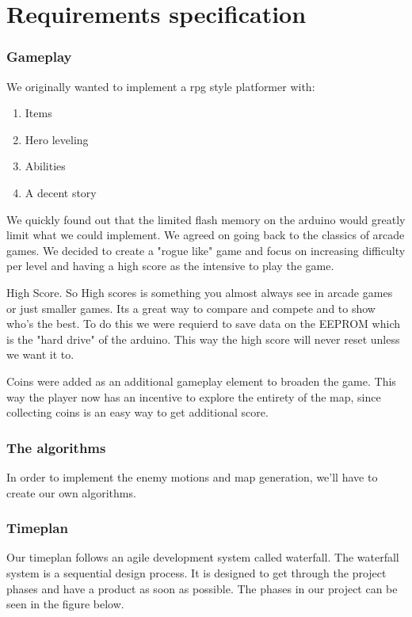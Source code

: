 \chapter{Requirements specification}

\subsection{Gameplay}%
We originally wanted to implement a rpg style platformer with:
\begin{enumerate}
\item Items
\item Hero leveling
\item Abilities
\item A decent story
\end{enumerate}
We quickly found out that the limited flash memory on the arduino would greatly limit what we could implement. We agreed on going back to the classics of arcade games. We decided to create a "rogue like" game and focus on increasing difficulty per level and having a high score as the intensive to play the game.

High Score.
So High scores is something you almost always see in arcade games or just smaller games. Its a great way to compare and compete and to show who's the best. 
To do this we were requierd to save data on the EEPROM which is the "hard drive" of the arduino. This way the high score will never reset unless we want it to.

Coins were added as an additional gameplay element to broaden the game. This way the player now has an incentive to explore the entirety of the map, since collecting coins is an easy way to get additional score.


\subsection{The algorithms}
In order to implement the enemy motions and map generation, we'll have to create our
own algorithms.



\subsection{Timeplan} %
Our timeplan follows an agile development system called waterfall.
The waterfall system is a sequential design process.
It is designed to get through the project phases and have a product as soon as
possible. The phases in our project can be seen in the figure below.

